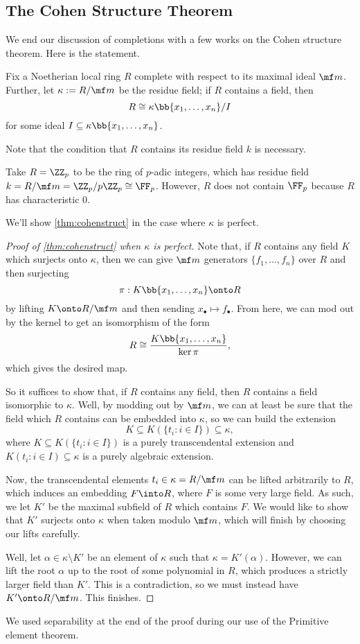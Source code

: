 \documentclass[../notes.tex]{subfiles}
\begin{document}
\subsection{The Cohen Structure Theorem}
We end our discussion of completions with a few works on the Cohen structure theorem. Here is the statement.
\begin{theorem} \label{thm:cohenstruct}
	Fix a Noetherian local ring $R$ complete with respect to its maximal ideal $\mf m$. Further, let $\kappa:=R/\mf m$ be the residue field; if $R$ contains a field, then
	\[R\cong\kappa\bb{x_1,\ldots,x_n}/I\]
	for some ideal $I\subseteq\kappa\bb{x_1,\ldots,x_n}$.
\end{theorem}
Note that the condition that $R$ contains its residue field $k$ is necessary.
\begin{nex}
	Take $R=\ZZ_p$ to be the ring of $p$-adic integers, which has residue field $k=R/\mf m=\ZZ_p/p\ZZ_p\cong\FF_p$. However, $R$ does not contain $\FF_p$ because $R$ has characteristic $0$.
\end{nex}
We'll show \autoref{thm:cohenstruct} in the case where $\kappa$ is perfect.
\begin{proof}[Proof of \autoref{thm:cohenstruct} when $\kappa$ is perfect]
	Note that, if $R$ contains any field $K$ which surjects onto $\kappa$, then we can give $\mf m$ generators $\{f_1,\ldots,f_n\}$ over $R$ and then surjecting
	\[\pi:K\bb{x_1,\ldots,x_n}\onto R\]
	by lifting $K\onto R/\mf m$ and then sending $x_\bullet\mapsto f_\bullet$. %
	From here, we can mod out by the kernel to get an isomorphism of the form
	\[R\cong\frac{K\bb{x_1,\ldots,x_n}}{\ker\pi},\]
	which gives the desired map.

	So it suffices to show that, if $R$ contains any field, then $R$ contains a field isomorphic to $\kappa$. Well, by modding out by $\mf m$, we can at least be sure that the field which $R$ contains can be embedded into $\kappa$, so we can build the extension
	\[K\subseteq K(\{t_i:i\in I\})\subseteq\kappa,\]
	where $K\subseteq K(\{t_i:i\in I\})$ is a purely transcendental extension and $K(t_i:i\in I)\subseteq\kappa$ is a purely algebraic extension.

	Now, the transcendental elements $t_i\in\kappa=R/\mf m$ can be lifted arbitrarily to $R$, which induces an embedding $F\into R$, where $F$ is some very large field. As such, we let $K'$ be the maximal subfield of $R$ which contains $F$. We would like to show that $K'$ surjects onto $\kappa$ when taken modulo $\mf m$, which will finish by choosing our lifts carefully.

	Well, let $\alpha\in\kappa\setminus K'$ be an element of $\kappa$ such that $\kappa=K'(\alpha)$. However, we can lift the root $\alpha$ up to the root of some polynomial in $R$, which produces a strictly larger field than $K'$. This is a contradiction, so we must instead have $K'\onto R/\mf m$. This finishes.
\end{proof}
\begin{remark}
	We used separability at the end of the proof during our use of the Primitive element theorem.
\end{remark}
\end{document}
